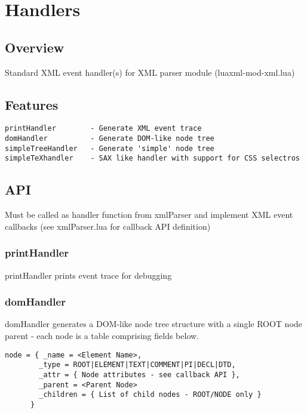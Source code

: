 \documentclass{ltxdoc}
\begin{document}
\section{Handlers}\label{sec:handlers}

\subsection{Overview}

Standard XML event handler(s) for XML parser module (luaxml-mod-xml.lua)

\subsection{Features}

\begin{verbatim}
printHandler        - Generate XML event trace
domHandler          - Generate DOM-like node tree
simpleTreeHandler   - Generate 'simple' node tree
simpleTeXhandler    - SAX like handler with support for CSS selectros
\end{verbatim}
\subsection{API}

Must be called as handler function from xmlParser and implement XML
event callbacks (see xmlParser.lua for callback API definition)

\subsubsection{printHandler}

printHandler prints event trace for debugging

\subsubsection{domHandler}

domHandler generates a DOM-like node tree  structure with 
a single ROOT node parent - each node is a table comprising 
fields below.

\begin{verbatim}
node = { _name = <Element Name>,
        _type = ROOT|ELEMENT|TEXT|COMMENT|PI|DECL|DTD,
        _attr = { Node attributes - see callback API },
        _parent = <Parent Node>
        _children = { List of child nodes - ROOT/NODE only }
      }

\end{verbatim}
\end{document}
